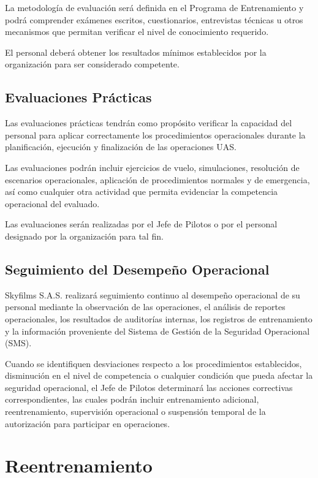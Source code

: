 La metodología de evaluación será definida en el Programa de Entrenamiento y podrá comprender exámenes escritos, cuestionarios, entrevistas técnicas u otros mecanismos que permitan verificar el nivel de conocimiento requerido.

El personal deberá obtener los resultados mínimos establecidos por la organización para ser considerado competente.



\subsection{Evaluaciones Prácticas}

Las evaluaciones prácticas tendrán como propósito verificar la capacidad del personal para aplicar correctamente los procedimientos operacionales durante la planificación, ejecución y finalización de las operaciones UAS.

Las evaluaciones podrán incluir ejercicios de vuelo, simulaciones, resolución de escenarios operacionales, aplicación de procedimientos normales y de emergencia, así como cualquier otra actividad que permita evidenciar la competencia operacional del evaluado.

Las evaluaciones serán realizadas por el Jefe de Pilotos o por el personal designado por la organización para tal fin.

\subsection{Seguimiento del Desempeño Operacional}

Skyfilms S.A.S. realizará seguimiento continuo al desempeño operacional de su personal mediante la observación de las operaciones, el análisis de reportes operacionales, los resultados de auditorías internas, los registros de entrenamiento y la información proveniente del Sistema de Gestión de la Seguridad Operacional (SMS).

Cuando se identifiquen desviaciones respecto a los procedimientos establecidos, disminución en el nivel de competencia o cualquier condición que pueda afectar la seguridad operacional, el Jefe de Pilotos determinará las acciones correctivas correspondientes, las cuales podrán incluir entrenamiento adicional, reentrenamiento, supervisión operacional o suspensión temporal de la autorización para participar en operaciones.

\section{Reentrenamiento}


